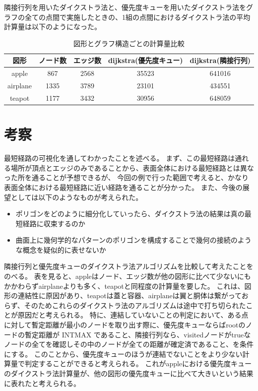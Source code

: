 \documentclass[a4paper,11pt]{jsarticle}
\begin{document}
隣接行列を用いたダイクストラ法と、優先度キューを用いたダイクストラ法をグラフの全ての点間で実施したときの、1組の点間におけるダイクストラ法の平均計算量は以下のようになった。

\begin{table}[H]
  \centering\begin{tabular}{ccccc}
  図形 & ノード数 & エッジ数 & dijkstra(優先度キュー) & dijkstra(隣接行列) \\
  \hline
  apple & 867 & 2568 & 35523 & 641016 \\
  airplane & 1335 & 3789 & 23101 & 434551 \\
  teapot & 1177 & 3432 & 30956 & 648059 \\
  \hline
  \end{tabular}
  \caption{図形とグラフ構造ごとの計算量比較}
  \label{graph-calc}
\end{table}

\section{考察}

最短経路の可視化を通してわかったことを述べる。
まず、この最短経路は通れる場所が頂点とエッジのみであることから、表面全体における最短経路とは異なった所を通ることが予想できるが、
今回の例で行った範囲で考えると、かなり表面全体における最短経路に近い経路を通ることが分かった。
また、今後の展望としては以下のようなものが考えられた。

\begin{itemize}
  \item ポリゴンをどのように細分化していったら、ダイクストラ法の結果は真の最短経路に収束するのか
  \item 曲面上に幾何学的なパターンのポリゴンを構成することで幾何の接続のような概念を疑似的に表せないか
\end{itemize}

隣接行列と優先度キューのダイクストラ法アルゴリズムを比較して考えたことをのべる。
表を見ると、appleはノード、エッジ数が他の図形に比べて少ないにもかかわらずairplaneよりも多く、teapotと同程度の計算量を要した。
これは、図形の連結性に原因があり、teapotは蓋と容器、airplaneは翼と胴体は繋がっておらず、そのためこれらのダイクストラ法のアルゴリズムは途中で打ち切られたことが原因だと考えられる。
特に、連結していないことの判定において、ある点に対して暫定距離が最小のノードを取り出す際に、優先度キューならばrootのノードの暫定距離が INTMAX であること、隣接行列なら、visitedノードがtrueなノードの全てを確認しその中のノードが全ての距離が確定済であること、を条件にする。
このことから、優先度キューのほうが連結でないことをより少ない計算量で判定することができると考えられる。
これがappleにおける優先度キューのダイクストラ法計算量が、他の図形の優先度キューに比べて大きいという結果に表れたと考えられる。
\end{document}
